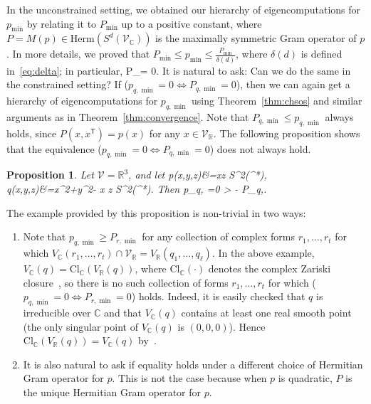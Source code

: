 \documentclass[11pt]{article}
\numberwithin{theorem}{section}
\newtheorem{prop}[theorem]{Proposition}
\newtheorem{question}[theorem]{Question}
\theoremstyle{definition}
\renewcommand{\t}{{\scriptscriptstyle\mathsf{T}}}
\newcommand{\setft}[1]{\mathrm{#1}}
\newcommand{\Herm}{\setft{Herm}}
\newcommand{\complex}{\mathbb{C}}
\newcommand{\real}{\mathbb{R}}
\newcommand\V{\mathcal{V}}
\def\ba#1\ea{\begin{align}#1\end{align}}
\newcommand{\cl}{\setft{Cl}}
\newcommand{\Vc}{\V_{\complex}}
\newcommand{\Vr}{\V_{\real}}
\newcommand{\pmin}{p_{\min}}
\newcommand{\Pmin}{P_{\min}}
\begin{document}
In the unconstrained setting, we obtained our hierarchy of eigencomputations for $p_{\min}$ by relating it to $P_{\min}$ up to a positive constant, where $P=M(p) \in \Herm(S^d(\Vc))$ is the maximally symmetric Gram operator of $p$. In more details, we proved that $P_{\min} \leq p_{\min} \leq \frac{P_{\min}}{\delta(d)}$, where $\delta(d)$ is defined in~\eqref{eq:delta}; in particular,
\ba
\pmin=0 \iff \Pmin = 0.
\ea
It is natural to ask: Can we do the same in the constrained setting? If ($p_{q,\min}= 0 \iff P_{q,\min}=0$), then we can again get a hierarchy of eigencomputations for $p_{q,\min}$ using Theorem~\ref{thm:chsos} and similar arguments as in Theorem~\ref{thm:convergence}. Note that $P_{q,\min} \leq p_{q,\min}$ always holds, since $P(x,x^\t)=p(x)$ for any $x \in \Vr$. The following proposition shows that the equivalence ($p_{q,\min}= 0 \iff P_{q,\min}=0$) does not always hold.






\begin{prop}\label{prop:constraints_counterexample}
Let $\V=\real^3$, and let
\ba\label{eq:example}
p(x,y,z)&=xz \in S^2(\V^*),\\
q(x,y,z)&=x^2+y^2- x z \in S^2(\V^*).
\ea
Then
\ba\label{eq:counterexample}
p_{q, \min} =0 > - \geq   P_{q,\min}.
\ea
\end{prop}

The example provided by this proposition is non-trivial in two ways:
\begin{enumerate}
\item Note that $p_{q,\min} \geq P_{r,\min}$ for any collection of complex forms $r_1,\dots, r_t$ for which $V_{\complex}(r_1,\dots, r_t) \cap \Vr = V_{\real}(q_1,\dots, q_{\ell})$. In the above example, $V_{\complex}(q)=\cl_{\complex}(V_{\real}(q))$, where $\cl_{\complex}(\cdot)$ denotes the complex Zariski closure~\cite{harris2013algebraic}, so there is no such collection of forms $r_1,\dots, r_t$ for which ($p_{q,\min}=0 \iff P_{r,\min}=0$) holds. Indeed, it is easily checked that $q$ is irreducible over $\complex$ and that $V_{\complex}(q)$ contains at least one real smooth point (the only singular point of $V_{\complex}(q)$ is $(0,0,0)$). Hence $\setft{Cl}_{\complex}(V_{\real}(q))=V_{\complex}(q)$ by~\cite[Theorem 2.2.9(2)]{mangolte2020real}.
\item It is also natural to ask if equality holds under a different choice of Hermitian Gram operator for $p$. This is not the case because when $p$ is quadratic, $P$ is the unique Hermitian Gram operator for $p$.
\end{enumerate}
\end{document}
